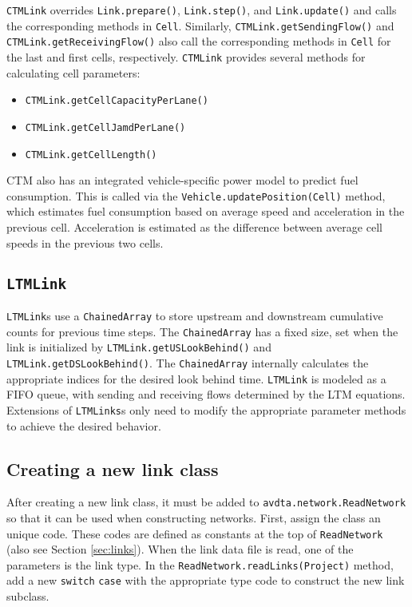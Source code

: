 \texttt{CTMLink} overrides \texttt{Link.prepare()}, \texttt{Link.step()}, and \texttt{Link.update()} and calls the corresponding methods in \texttt{Cell}. Similarly, \texttt{CTMLink.getSendingFlow()} and \texttt{CTMLink.getReceivingFlow()} also call the corresponding methods in \texttt{Cell} for the last and first cells, respectively. \texttt{CTMLink} provides several methods for calculating cell parameters:
\begin{itemize}
	\item \texttt{CTMLink.getCellCapacityPerLane()}
	\item \texttt{CTMLink.getCellJamdPerLane()}
	\item \texttt{CTMLink.getCellLength()}
\end{itemize}
%
CTM also has an integrated vehicle-specific power model to predict fuel consumption. This is called via the \texttt{Vehicle.updatePosition(Cell)} method, which estimates fuel consumption based on average speed and acceleration in the previous cell. Acceleration is estimated as the difference between average cell speeds in the previous two cells.

\subsection{\texttt{LTMLink}}

\texttt{LTMLink}s use a \texttt{ChainedArray} to store upstream and downstream cumulative counts for previous time steps. The \texttt{ChainedArray} has a fixed size, set when the link is initialized by \texttt{LTMLink.getUSLookBehind()} and \texttt{LTMLink.getDSLookBehind()}. The \texttt{ChainedArray} internally calculates the appropriate indices for the desired look behind time. \texttt{LTMLink} is modeled as a FIFO queue, with sending and receiving flows determined by the LTM equations. Extensions of \texttt{LTMLinks}s only need to modify the appropriate parameter methods to achieve the desired behavior.

\subsection{Creating a new link class}

After creating a new link class, it must be added to \texttt{avdta.network.ReadNetwork} so that it can be used when constructing networks. First, assign the class an unique code. These codes are defined as constants at the top of \texttt{ReadNetwork} (also see Section \ref{sec:links}). When the link data file is read, one of the parameters is the link type. In the \texttt{ReadNetwork.readLinks(Project)} method, add a new \texttt{switch} \texttt{case} with the appropriate type code to construct the new link subclass.


